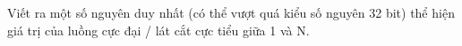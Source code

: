Viết ra một số nguyên duy nhất (có thể vượt quá kiểu số nguyên 32 bit) thể hiện giá trị của luồng cực đại / lát cắt cực tiểu giữa 1 và N.  

\